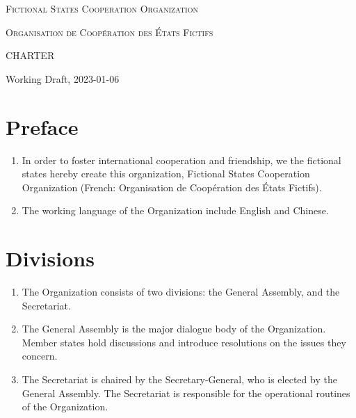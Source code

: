 \documentclass[11pt,a4paper]{article}
\begin{document}
\begin{minipage}{\linewidth}
	\parskip=12pt
	\center
	\large
	\textsc{Fictional States Cooperation Organization}

	\textsc{Organisation de Coopération des États Fictifs}

    \vskip 20pt

	\huge
	CHARTER
    
    \vskip 20pt
    \small
    Working Draft, 2023-01-06
\end{minipage}
\vskip 40pt



\section{Preface}
\begin{enumerate}
	\item In order to foster international cooperation and friendship, we the fictional states hereby create this organization,
	      Fictional States Cooperation Organization (French: Organisation de Coopération des États Fictifs).
    \item The working language of the Organization include English and Chinese.
\end{enumerate}


\section{Divisions}
\begin{enumerate}
	\item The Organization consists of two divisions: the General Assembly, and the Secretariat.
	\item The General Assembly is the major dialogue body of the Organization.
	      Member states hold discussions and introduce resolutions on the issues they concern.
	\item The Secretariat is chaired by the Secretary-General, who is elected by the General Assembly.
	      The Secretariat is responsible for the operational routines of the Organization.
\end{enumerate}
\end{document}
